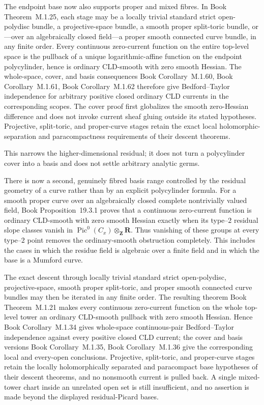 \documentclass[11pt,a4paper]{article}
\theoremstyle{definition}
\theoremstyle{remark}
\begin{document}
The endpoint base now also supports proper and mixed fibres.  In
Book Theorem~M.1.25, each stage may be a
locally trivial standard strict open-polydisc bundle, a projective-space
bundle, a smooth proper split-toric bundle, or---over an algebraically
closed field---a proper smooth connected curve bundle, in any finite order.
Every continuous zero-current function
on the entire top-level space is the pullback of a unique logarithmic-affine
function on the endpoint polycylinder, hence is ordinary CLD-smooth with
zero smooth Hessian.  The whole-space, cover, and basis consequences
Book Corollary~M.1.60, Book Corollary~M.1.61, Book Corollary~M.1.62
therefore give Bedford--Taylor independence for arbitrary positive closed
ordinary CLD currents in the corresponding scopes.  The cover proof first
globalizes the smooth zero-Hessian difference and does not invoke current
sheaf gluing outside its stated hypotheses.  Projective, split-toric, and
proper-curve stages retain the exact local holomorphic-separation and
paracompactness requirements of their descent theorems.

This narrows the higher-dimensional residual; it does not turn a
polycylinder cover into a basis and does not settle arbitrary analytic
germs.

There is now a second, genuinely fibred basis range controlled by the
residual geometry of a curve rather than by an explicit polycylinder
formula.  For a smooth proper curve over an algebraically closed complete
nontrivially valued field,
Book Proposition~19.3.1 proves that a continuous
zero-current function is ordinary CLD-smooth with zero smooth Hessian
exactly when its type--\(2\) residual slope classes vanish in
\(\operatorname{Pic}^0(C_x)\otimes_{\mathbf Z}\mathbf R\).  Thus vanishing
of these groups at every type--\(2\) point removes the ordinary-smooth
obstruction completely.  This includes the cases in which the residue field
is algebraic over a finite field and in which the base is a Mumford curve.

The exact descent through locally trivial standard strict open-polydisc,
projective-space, smooth proper split-toric, and proper smooth connected
curve bundles may then be iterated in any finite order.  The resulting
theorem
Book Theorem~M.1.21 makes every continuous
zero-current function on the whole top-level tower an ordinary CLD-smooth
pullback with zero smooth Hessian.  Hence
Book Corollary~M.1.34 gives whole-space
continuous-pair Bedford--Taylor independence against every positive closed
CLD current; the cover and basis versions
Book Corollary~M.1.35, Book Corollary~M.1.36
give the corresponding local and every-open conclusions.  Projective,
split-toric, and proper-curve stages retain the locally holomorphically
separated and paracompact base hypotheses of their descent theorems, and no nonsmooth
current is pulled back.  A single mixed-tower chart inside an unrelated
open set is still insufficient, and no assertion is made beyond the
displayed residual-Picard bases.
\end{document}
